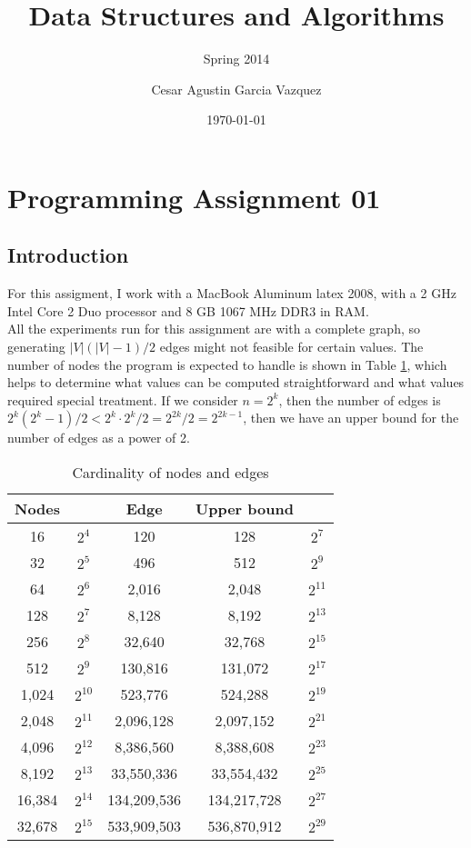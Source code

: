\documentclass[tikz, 12pt]{scrartcl}
\title{Data Structures and Algorithms}
\subtitle{Spring 2014}
\author{Cesar Agustin Garcia Vazquez}
\date{\today}                                           %
\begin{document}
\maketitle
\section{Programming Assignment 01}

\subsection{Introduction}
For this assigment, I work with a MacBook Aluminum latex 2008, with a 2 GHz Intel Core 2 Duo processor and 8 GB 1067 MHz DDR3 in RAM. \\
All the experiments run for this assignment are with a complete graph, so generating $|V|(|V| - 1)/2$ edges might not feasible for certain values. The number of nodes the program is expected to handle is shown in Table \ref{cardinalities}, which helps to determine what values can be computed straightforward and what values required special treatment. If we consider $n = 2^k$, then the number of edges is $2^k(2^k - 1) / 2 < 2^k \cdot 2^k / 2 = 2^{2k} / 2 = 2^{2k - 1}$, then we have an upper bound for the number of edges as a power of 2.

\begin{table}[ht!]
\caption{\label{cardinalities}Cardinality of nodes and edges}
\centering
\begin{tabular}{|c|c|c|c|c|}
\hline
Nodes		&			&	Edge			& Upper bound	&	\\
\hline
16			&	$2^4$	& 	120	 		&	128		&	$2^{7}$\\
32			&	$2^5$	&	496			&	512		&	$2^{9}$\\
64			&	$2^6$	&	2,016		& 2,048		&	$2^{11}$\\
128			&	$2^7$	&	8,128		& 8,192		&	$2^{13}$\\
256			&	$2^8$	&	32,640		&32,768		&	$2^{15}$\\
512			&	$2^9$	&	130,816		&131,072		&	$2^{17}$\\
1,024		&	$2^{10}$	& 	523,776		&524,288		&	$2^{19}$\\
2,048		&	$2^{11}$ 	& 	2,096,128		&2,097,152	&	$2^{21}$\\
4,096		&	$2^{12}$	&     8,386,560		&8,388,608	&	$2^{23}$\\
8,192		&	$2^{13}$	&   33,550,336		& 33,554,432	&	$2^{25}$\\
16,384		&	$2^{14}$	& 134,209,536		& 134,217,728	&	$2^{27}$\\
32,678		&	$2^{15}$	& 533,909,503		& 536,870,912	&	$2^{29}$\\
\hline
\end{tabular}
\end{table}
\end{document}
